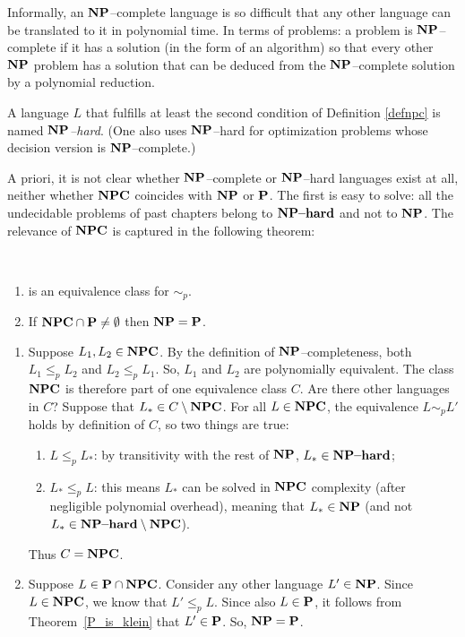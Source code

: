 Informally, an $\NP$--complete language is so difficult that any other
language can be translated to it in polynomial time. In terms of problems:
a problem is $\NP$--complete if it has a solution (in the form of an
algorithm) so that every other $\NP$ problem has a solution that can
be deduced from the $\NP$--complete solution by a polynomial reduction. 

A language $L$ that fulfills at least the second condition of Definition
\ref{defnpc} is named {\em $\NP$--hard}. (One also uses $\NP$--hard for
optimization problems whose decision version is $\NP$--complete.)

A priori, it is not clear whether
$\NP$--complete or $\NP$--hard languages exist at all, neither whether $\NPC$
coincides with $\NP$ or $\P$. The first is easy to solve: all the undecidable problems of past chapters belong to $\NPhard$ and not to $\NP$. The relevance of $\NPC$ is captured in the following theorem:

\begin{theorem}~
	\begin{enumerate}
		\item \NPC is an equivalence class for $\sim_p$.
		\item If $\NPC\cap\P\neq \emptyset$ then $\NP=\P$.
	\end{enumerate}
\end{theorem}
\begin{proof*}
\begin{enumerate}
	\item Suppose $L_1,L_2\in\NPC$. By the definition of $\NP$--completeness,
	both $L_1 \leq_p L_2$ and $L_2 \leq_p L_1$. So, $L_1$ and $L_2$ are
	polynomially equivalent. The class $\NPC$ is therefore part of one
	equivalence class $C$. Are there other languages in $C$? Suppose that $L_* \in C\setminus \NPC$. For all $L\in\NPC$, the equivalence $L\sim_p L'$ holds by definition of $C$, so two things are true: 
	\begin{enumerate}
		\item $L \leq_p L_*$: by transitivity with the rest of $\NP$, $L_* \in\NPhard$;
		\item $L_* \leq_p L$: this means $L_*$ can be solved in $\NPC$ complexity (after negligible polynomial overhead), meaning that $L_*\in\NP$ (and not $L_*\in\NPhard\setminus\NPC$).
	\end{enumerate}
	Thus $C = \NPC$.
	
	\item Suppose $L\in\P \cap\NPC$. Consider any other language $L'\in
	\NP$. Since $L\in\NPC$, we know that $L' \leq_p L$. Since also
	$L\in\P$, it follows from Theorem~\ref{P_is_klein} that $L'\in
	\P$. So, $\NP=\P$.\vspace{-2em}
\end{enumerate}
\end{proof*}


